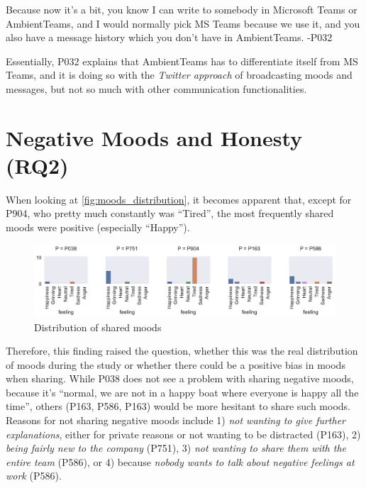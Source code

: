 \begin{displayquote}
    Because now it's a bit, you know I can write to somebody in Microsoft Teams or AmbientTeams, and I would normally pick MS Teams because we use it, and you also have a message history which you don't have in AmbientTeams. -P032
\end{displayquote}

Essentially, P032 explains that AmbientTeams has to differentiate itself from MS Teams, and it is doing so with the \textit{Twitter approach} of broadcasting moods and messages, but not so much with other communication functionalities.

\section{Negative Moods and Honesty (RQ2)}
\label{section:negative_moods_and_honesty}

When looking at \autoref{fig:moods_distribution}, it becomes apparent that, except for P904, who pretty much constantly was \enquote{Tired}, the most frequently shared moods were positive (especially \enquote{Happy}).

\begin{figure}[h]
    \centering
    \includegraphics[width=\linewidth]{plots/moods_distribution.pdf}
    \caption{Distribution of shared moods }
    \label{fig:moods_distribution}
\end{figure}

Therefore, this finding raised the question, whether this was the real distribution of moods during the study or whether there could be a positive bias in moods when sharing. While P038 does not see a problem with sharing negative moods, because it's \enquote{normal, we are not in a happy boat where everyone is happy all the time}, others (P163, P586, P163) would be more hesitant to share such moods. Reasons for not sharing negative moods include 1) \textit{not wanting to give further explanations}, either for private reasons or not wanting to be distracted (P163), 2) \textit{being fairly new to the company} (P751), 3) \textit{not wanting to share them with the entire team} (P586), or 4) because \textit{nobody wants to talk about negative feelings at work} (P586).

